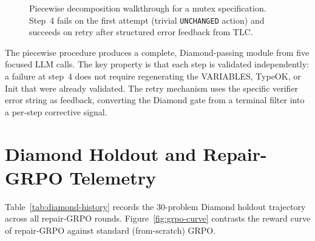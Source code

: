 \documentclass[11pt]{article}
\begin{document}
\begin{figure}[h]
\caption{Piecewise decomposition walkthrough for a mutex specification.
Step~4 fails on the first attempt (trivial \texttt{UNCHANGED} action)
and succeeds on retry after structured error feedback from TLC.}
\label{fig:piecewise-example}
\end{figure}

\noindent The piecewise procedure produces a complete, Diamond-passing
module from five focused LLM calls. The key property is that each step
is validated independently: a failure at step~4 does not require
regenerating the VARIABLES, TypeOK, or Init that were already validated.
The retry mechanism uses the specific verifier error string as feedback,
converting the Diamond gate from a terminal filter into a per-step
corrective signal.

\section{Diamond Holdout and Repair-GRPO Telemetry}
\label{sec:app-diamond-telemetry}

Table~\ref{tab:diamond-history} records the 30-problem Diamond holdout
trajectory across all repair-GRPO rounds.
Figure~\ref{fig:grpo-curve} contrasts the reward curve of repair-GRPO
against standard (from-scratch) GRPO.
\end{document}
